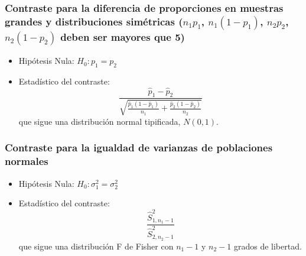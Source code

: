 \subsubsection{Contraste para la diferencia de proporciones en muestras grandes y distribuciones simétricas ($n_1p_1$, $n_1(1-p_1)$, $n_2p_2$,
$n_2(1-p_2)$ deben ser mayores que 5)}
\begin{itemize}
\item Hipótesis Nula: $H_0:p_1=p_2$
\item Estadístico del contraste:
\[
\frac{{\hat p_1  - \hat p_2 }}{{\sqrt {\frac{{\hat p_1 \left( {1 - \hat p_1 }
\right)}}{{n_1 }} + \frac{{\hat p_2 \left( {1 - \hat p_2 } \right)}}{{n_2
}}} }}
\]
que sigue una distribución normal tipificada, $N(0,1)$.
\end{itemize}

\subsubsection{Contraste para la igualdad de varianzas de poblaciones normales}
\begin{itemize}
\item Hipótesis Nula: $H_0:\sigma_1^2=\sigma_2^2$
\item Estadístico del contraste:
\[
\frac{{\hat S^2_{1,n_1-1} }}{{\hat S^2_{2,n_2-1} }}
\]
que sigue una distribución F de Fisher con $n_1-1$ y $n_2-1$ grados de libertad.
\end{itemize}


\clearpage
\newpage


